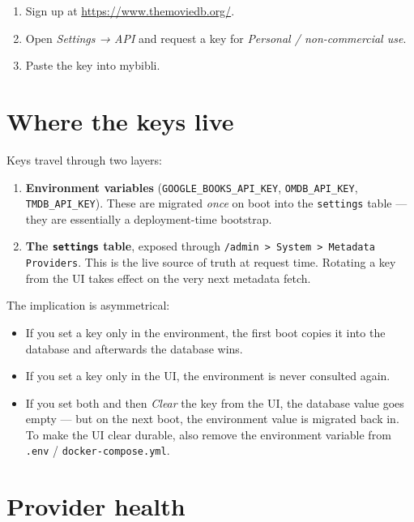\begin{enumerate}
  \item Sign up at \url{https://www.themoviedb.org/}.
  \item Open \emph{Settings → API} and request a key for
        \emph{Personal / non-commercial use}.
  \item Paste the key into mybibli.
\end{enumerate}

\section{Where the keys live}

Keys travel through two layers:

\begin{enumerate}
  \item \textbf{Environment variables}
        (\texttt{GOOGLE\_BOOKS\_API\_KEY}, \texttt{OMDB\_API\_KEY},
        \texttt{TMDB\_API\_KEY}). These are migrated \emph{once} on
        boot into the \texttt{settings} table — they are essentially
        a deployment-time bootstrap.
  \item \textbf{The \texttt{settings} table}, exposed through
        \texttt{/admin > System > Metadata Providers}. This is the
        live source of truth at request time. Rotating a key from
        the UI takes effect on the very next metadata fetch.
\end{enumerate}

The implication is asymmetrical:

\begin{itemize}
  \item If you set a key only in the environment, the first boot
        copies it into the database and afterwards the database
        wins.
  \item If you set a key only in the UI, the environment is never
        consulted again.
  \item If you set both and then \emph{Clear} the key from the UI,
        the database value goes empty — but on the next boot, the
        environment value is migrated back in. To make the UI clear
        durable, also remove the environment variable from
        \texttt{.env} / \texttt{docker-compose.yml}.
\end{itemize}

\section{Provider health}


